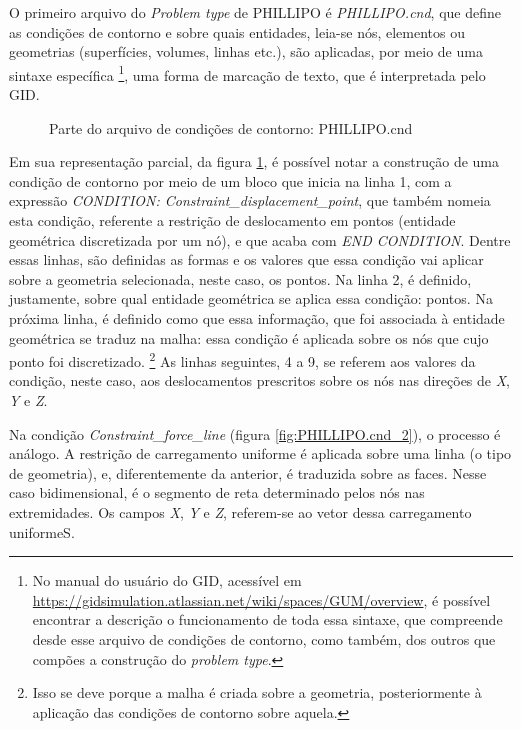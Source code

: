 O primeiro arquivo do \emph{Problem type} de PHILLIPO é \emph{PHILLIPO.cnd}, que define as condições de contorno e sobre quais entidades, leia-se nós, elementos ou geometrias (superfícies, volumes, linhas etc.), são aplicadas, por meio de uma sintaxe específica \footnote{No manual do usuário do GID, acessível em \url{https://gidsimulation.atlassian.net/wiki/spaces/GUM/overview}, é possível encontrar a descrição o funcionamento de toda essa sintaxe, que compreende desde esse arquivo de condições de contorno, como também, dos outros que compões a construção do \emph{problem type}.}, uma forma de marcação de texto, que é interpretada pelo GID.

\begin{figure}[hbtp]
    \caption{Parte do arquivo de condições de contorno: PHILLIPO.cnd}
    
    \label{fig:PHILLIPO.cnd}
\end{figure}

Em sua representação parcial, da figura \ref{fig:PHILLIPO.cnd}, é possível notar a construção de uma condição de contorno por meio de um bloco que inicia na linha 1, com a expressão \emph{CONDITION: Constraint\_displacement\_point}, que também nomeia esta condição, referente a restrição de deslocamento em pontos (entidade geométrica discretizada por um nó), e que acaba com \emph{END CONDITION}. Dentre essas linhas, são definidas as formas e os valores que essa condição vai aplicar sobre a geometria selecionada, neste caso, os pontos. Na linha 2, é definido, justamente, sobre qual entidade geométrica se aplica essa condição: pontos. Na próxima linha, é definido como que essa informação, que foi associada à entidade geométrica se traduz na malha: essa condição é aplicada sobre os nós que cujo ponto foi discretizado. \footnote{Isso se deve porque a malha é criada sobre a geometria, posteriormente à aplicação das condições de contorno sobre aquela.} As linhas seguintes, 4 a 9, se referem aos valores da condição, neste caso, aos deslocamentos prescritos sobre os nós nas direções de \emph{X}, \emph{Y} e \emph{Z}. 

Na condição \emph{Constraint\_force\_line} (figura \ref{fig:PHILLIPO.cnd_2}), o processo é análogo. A restrição de carregamento uniforme é aplicada sobre uma linha (o tipo de geometria), e, diferentemente da anterior, é traduzida sobre as faces. Nesse caso bidimensional, é o segmento de reta determinado pelos nós nas extremidades. Os campos \emph{X}, \emph{Y} e \emph{Z}, referem-se ao vetor dessa carregamento uniformeS.

